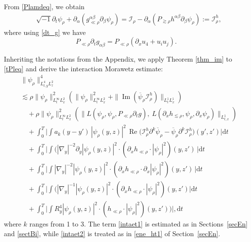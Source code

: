 \documentclass[11pt,letterpaper,reqno]{amsart}
\numberwithin{equation}{section}
\theoremstyle{definition}
\theoremstyle{remark}
\newcommand{\pa}{\partial}
\begin{document}
 From \eqref{Plamdeq}, we obtain
\begin{align} \label{tPleq}
	&	\sqrt{-1} \pa_t  \psi_\rho +  \partial_{\alpha} (g_{\ll \rho}^{\alpha \beta} \pa_\beta\psi_\rho)   = \mathcal{I}_\rho -   \partial_{ \alpha} (P_{\gtrsim  \rho }  h^{\alpha \beta}\pa_\beta \psi_{\rho} )
	:=\mathcal{I}_\rho^{h}, 
\end{align}
where using \eqref{dt_g} we have 
\begin{equation} \label{Prho.dt_g}
     P_{\ll \rho}\pa_t g_{\alpha \beta}  =P_{\ll \rho}( \pa_x u_4 + u_i u_j).
\end{equation}

Inheriting the notations from the Appendix, we apply Theorem \ref{thm_im} to \eqref{tPleq} and derive the interaction Morawetz estimate:
\begin{align}
	& \label{intaet0} \| \psi_\rho  \|^4_{L^4_{t,y}L^2_{z}}  \\
 &  \lesssim  \rho \|\psi_\rho\|_{L^\infty_t L^2_x}^2 (\|\psi_\rho\|_{L^\infty_t L^2_x}^2 +    \|\operatorname{Im}(\overline{\psi}_\rho \mathcal{I}_\rho^{h}) \|_{L^1_t L^1_x})\label{intaet1} \\
		&\quad + \rho\|\psi_\rho\|_{L^\infty_t L^2_x}^2(\| L(\psi_\rho,\psi_\rho,  P_{\ll \rho} \pa_t g),\  L(\pa_x h_{\lesssim \rho}, \psi_\rho ,\pa_x \psi_\rho)\|_{L^1_{t,x}})\label{intaet2} \\
        &\quad +\int_0^T\Big| \int a_k(y-y')\,   |\psi_\rho(y,z)|^2 \, \operatorname{Re}\big(\mathcal{I}_\rho^{h}  \partial^k \overline{\psi}_\rho - \overline{\psi}_\rho \partial^k\mathcal{I}_\rho^{h} \big)(y',z')  \Big| \mathrm{d}t\label{intaet25}\\
	 & \quad  + \int_0^T\Big|\int(|\nabla_y|^{-2}\pa_y  |\psi_\rho(y,z)|^2  \cdot (\pa_x h_{\ll \rho} \cdot |\psi_\rho|^2)(y,z')\, \Big|\mathrm{d}t\label{intaet3} \\
		&\quad    +\int_0^T\Big|\int   |\nabla_y|^{-2} |\psi_\rho(y,z)|^2 \cdot (\pa_x h_{\ll \rho}  \cdot \pa_x|\psi_\rho|^2)(y,z')\, \Big| \mathrm{d}t\label{intaet4} \\
	&\quad    + \int_0^T\Big|\int(|\nabla_y|^{-1}|\psi_\rho(y,z)|^2 \cdot( \pa_x h_{\ll \rho}  \cdot |\psi_\rho|^2)(y,z')\Big|\mathrm{d}t \label{intaet5}\\
	&\quad  +\int_0^T \Big|  \int R^4_y |\psi_\rho(y,z)|^2 \cdot (h_{\ll \rho}  \cdot|\psi_\rho|^2)(y,z'))\Big|, \mathrm{d}t\label{intaet6}
\end{align}
where \(k\) ranges from 1 to 3.
The term \eqref{intaet1} is estimated as in Sections~\ref{secEn} and \ref{sectBi}, while \eqref{intaet2} is treated as in \eqref{ene_ht1} of Section~\ref{secEn}.  
\end{document}
